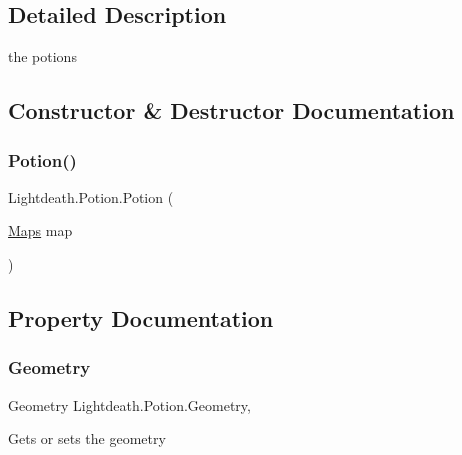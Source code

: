 \subsection{Detailed Description}
the potions 



\subsection{Constructor \& Destructor Documentation}
\hypertarget{class_lightdeath_1_1_potion_aa91f25c71ba7a2ea871c214ba806bf84}{}\label{class_lightdeath_1_1_potion_aa91f25c71ba7a2ea871c214ba806bf84} 
\subsubsection{\texorpdfstring{Potion()}{Potion()}}
{\footnotesize\ttfamily Lightdeath.\+Potion.\+Potion (\begin{DoxyParamCaption}\item[{\hyperlink{class_lightdeath_1_1_maps}{Maps}}]{map }\end{DoxyParamCaption})\hspace{0.3cm}{\ttfamily [inline]}}



\subsection{Property Documentation}
\hypertarget{class_lightdeath_1_1_potion_a1bcf61dc5365e8fa6599fb75c3edcbb2}{}\label{class_lightdeath_1_1_potion_a1bcf61dc5365e8fa6599fb75c3edcbb2} 
\subsubsection{\texorpdfstring{Geometry}{Geometry}}
{\footnotesize\ttfamily Geometry Lightdeath.\+Potion.\+Geometry\hspace{0.3cm}{\ttfamily [get]}, {\ttfamily [set]}}



Gets or sets the geometry 

\hypertarget{class_lightdeath_1_1_potion_aa9c80e31bd4b3c2becc4dbb4c636089f}{}\label{class_lightdeath_1_1_potion_aa9c80e31bd4b3c2becc4dbb4c636089f} 
